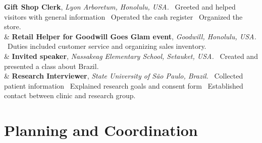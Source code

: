 \documentclass[11pt, a4paper]{article}
\newcommand{\Year}[1]{\fontsize{10pt}{0}\selectfont #1}
\begin{document}
\begin{EntriesTable}
	\textbf{Gift Shop Clerk},
	\newline
	\textit{Lyon Arboretum, Honolulu, USA.}
	\newline
	\textbullet \ Greeted and helped visitors with general information 
	\textbullet \ Operated the cash register 
	\textbullet \ Organized the store. 
	\\
	\Year{2018}  &
	\textbf{Retail Helper for Goodwill Goes Glam event},
	\newline
	\textit{Goodwill, Honolulu, USA.}
	\newline
	\textbullet \ Duties included customer service and organizing sales inventory.
	\\
	\Year{2017}  &
	\textbf{Invited speaker},
	\newline
	\textit{Nassakeag Elementary School, Setauket, USA.}
	\newline
	\textbullet \ Created and presented a class about Brazil.
	\\
	\Year{2009}  &
	\textbf{Research Interviewer},
	\newline
	\textit{State University of São Paulo, Brazil.}
	\newline
	\textbullet \ Collected patient information 
	\textbullet \ Explained research goals and consent form 
	\textbullet \ Established contact between clinic and research group.
	\\
	
\end{EntriesTable}

\section*{Planning and Coordination}
\end{document}
